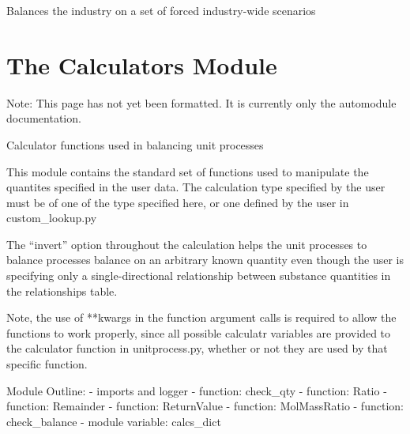\documentclass[a4paper,10pt,english]{sphinxmanual}
\begin{document}
\begin{fulllineitems}
\begin{fulllineitems}
\end{fulllineitems}


\begin{fulllineitems}
\label{\detokenize{industry:industry.Industry.run_scenarios}}
Balances the industry on a set of forced industry-wide scenarios

\end{fulllineitems}


\end{fulllineitems}



\section{The Calculators Module}
\label{\detokenize{calculators:the-calculators-module}}\label{\detokenize{calculators::doc}}
Note: This page has not yet been formatted. It is currently only the automodule documentation.

\label{\detokenize{calculators:module-calculators}}
Calculator functions used in balancing unit processes

This module contains the standard set of functions used to manipulate the
quantites specified in the user data. The calculation type specified by the
user must be of one of the type specified here, or one defined by the user in
custom\_lookup.py

The “invert” option throughout the calculation helps the unit processes to
balance processes balance on an arbitrary known quantity even though
the user is specifying only a single-directional relationship between substance
quantities in the relationships table.

Note, the use of **kwargs in the function argument calls is required to
allow the functions to work properly, since all possible calculatr variables
are provided to the calculator function in unitprocess.py, whether or
not they are used by that specific function.

Module Outline:
- imports and logger
- function: check\_qty
- function: Ratio
- function: Remainder
- function: ReturnValue
- function: MolMassRatio
- function: check\_balance
- module variable: calcs\_dict
\end{document}
